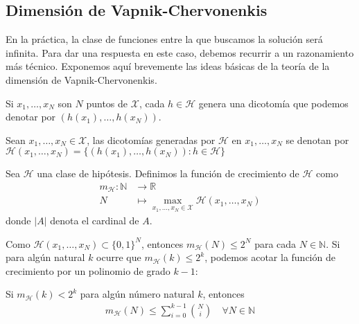 \subsection{Dimensión de Vapnik-Chervonenkis}
En la práctica, la clase de funciones entre la que buscamos la solución será infinita. Para dar una respuesta en este caso, debemos recurrir a un razonamiento más técnico. Exponemos aquí brevemente las ideas básicas de la teoría de la dimensión de Vapnik-Chervonenkis. 

Si $x_1, \ldots, x_N$ son $N$ puntos de $\mathcal{X}$, cada $h \in \mathcal{H}$ genera una dicotomía que podemos denotar por $(h(x_1), \ldots, h(x_N))$.
\begin{definition}
	Sean $x_1, \ldots, x_N \in \mathcal{X}$, las dicotomías generadas por $\mathcal{H}$ en $x_1, \ldots, x_N$ se denotan por $\mathcal{H}(x_1, \ldots, x_N) = \{ (h(x_1), \ldots, h(x_N)) \colon h \in \mathcal{H} \} $
\end{definition}

\begin{definition}
	Sea $\mathcal{H}$ una clase de hipótesis. Definimos la función de crecimiento de $\mathcal{H}$ como 
	\begin{align*}
		m_{\mathcal{H}} \colon \mathbb{N} &\to \mathbb{R}\\
		N &\mapsto \max_{x_1, \ldots, x_N \in \mathcal{X}}  \mathcal{H}(x_1, \ldots, x_N)
	\end{align*}
	donde $|A|$ denota el cardinal de $A$.
\end{definition}

Como  $\mathcal{H}(x_1, \ldots, x_N) \subset \{ 0, 1 \}^N$, entonces $m_{\mathcal{H}}(N) \leq 2^N$ para cada $N \in \mathbb{N}$. Si para algún natural $k$ ocurre que $m_{\mathcal{H}}(k) \leq 2^k$, podemos acotar la función de crecimiento por un polinomio de grado $k-1$:

\begin{prop}
	Si $m_{\mathcal{H}}(k) < 2^k$ para algún número natural $k$, entonces 
	\begin{align*}
		m_{\mathcal{H}}(N) \leq \sum_{i=0}^{k-1} \binom{N}{i} \quad \forall N \in \mathbb{N}
	\end{align*}
\end{prop}


